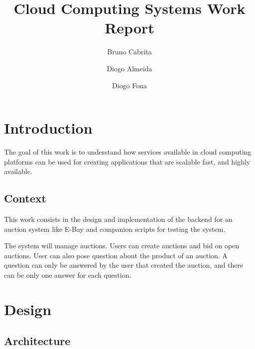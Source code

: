 \documentclass[runningheads]{llncs}
\begin{document}
%
\title{Cloud Computing Systems Work Report}
%
%
\author{Bruno Cabrita \and
Diogo Almeida \and
Diogo Fona}
%
%
%
\maketitle %
%
%
\section{Introduction}
The goal of this work is to understand how services available in cloud computing platforms can be used for creating applications that are scalable fast, and highly available.

\subsection{Context}
This work consists in the design and implementation of the backend for an auction system like E-Bay and companion scripts for testing the system.

The system will manage auctions. Users can create auctions and bid on open auctions. User can also pose question about the product of an auction. A question can only be answered by the user that created the auction, and there can be only one answer for each question.


\section{Design}


\subsection{Architecture}
\end{document}
